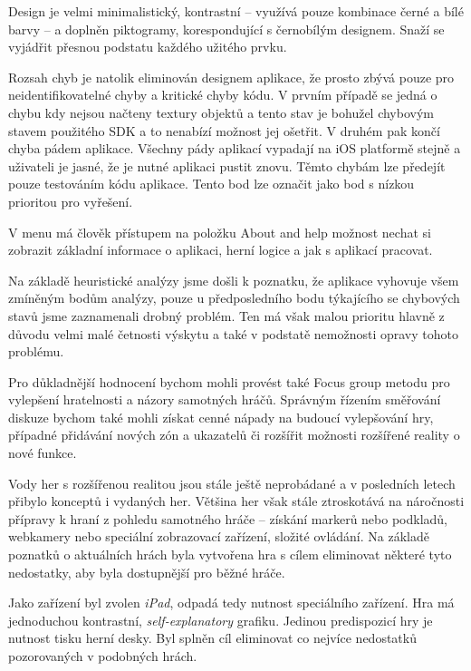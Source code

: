 \documentclass[twoside,12pt]{article}
\begin{document}
Design je velmi minimalistický, kontrastní -- využívá pouze kombinace černé a bílé barvy -- a doplněn piktogramy, korespondující s černobílým designem. Snaží se vyjádřit přesnou podstatu každého užitého prvku.

Rozsah chyb je natolik eliminován designem aplikace, že prosto zbývá pouze pro neidentifikovatelné chyby a kritické chyby kódu. V prvním případě se jedná o chybu kdy nejsou načteny textury objektů a tento stav je bohužel chybovým stavem použitého SDK a to nenabízí možnost jej ošetřit. V druhém pak končí chyba pádem aplikace. Všechny pády aplikací vypadají na iOS platformě stejně a uživateli je jasné, že je nutné aplikaci pustit znovu. Těmto chybám lze předejít pouze testováním kódu aplikace. Tento bod lze označit jako bod s nízkou prioritou pro vyřešení.

V menu má člověk přístupem na položku About and help možnost nechat si zobrazit základní informace o aplikaci, herní logice a jak s aplikací pracovat.

Na základě heuristické analýzy jsme došli k poznatku, že aplikace vyhovuje všem zmíněným bodům analýzy, pouze u předposledního bodu týkajícího se chybových stavů jsme zaznamenali drobný problém. Ten má však malou prioritu hlavně z důvodu velmi malé četnosti výskytu a také v podstatě nemožnosti opravy tohoto problému. 

Pro důkladnější hodnocení bychom mohli provést také Focus group metodu pro vylepšení hratelnosti a názory samotných hráčů. Správným řízením směřování diskuze bychom také mohli získat cenné nápady na budoucí vylepšování hry, případné přidávání nových zón a ukazatelů či rozšířit možnosti rozšířené reality o nové funkce. 

% 
\newpage

%
%

Vody her s rozšířenou realitou jsou stále ještě neprobádané a v posledních letech přibylo konceptů i vydaných her. Většina her však stále ztroskotává na náročnosti přípravy k hraní z pohledu samotného hráče -- získání markerů nebo podkladů, webkamery nebo speciální zobrazovací zařízení, složité ovládání. Na základě poznatků o aktuálních hrách byla vytvořena hra s cílem eliminovat některé tyto nedostatky, aby byla dostupnější pro běžné hráče. 

Jako zařízení byl zvolen \textit{iPad}, odpadá tedy nutnost speciálního zařízení. Hra má jednoduchou kontrastní, \textit{self-explanatory} grafiku. Jedinou predispozicí hry je nutnost tisku herní desky. Byl splněn cíl eliminovat co nejvíce nedostatků pozorovaných v podobných hrách.
\end{document}
